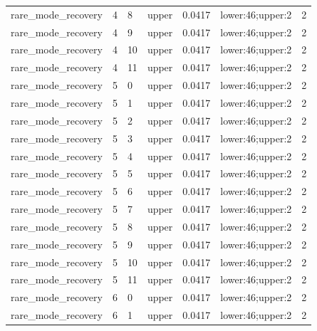 \documentclass{article}
\begin{document}
\begin{table}[tbp]
{\begin{tabular}{lllllll}
rare\_mode\_recovery & 4 & 8 & upper & 0.0417 & lower:46;upper:2 & 2 \\
rare\_mode\_recovery & 4 & 9 & upper & 0.0417 & lower:46;upper:2 & 2 \\
rare\_mode\_recovery & 4 & 10 & upper & 0.0417 & lower:46;upper:2 & 2 \\
rare\_mode\_recovery & 4 & 11 & upper & 0.0417 & lower:46;upper:2 & 2 \\
rare\_mode\_recovery & 5 & 0 & upper & 0.0417 & lower:46;upper:2 & 2 \\
rare\_mode\_recovery & 5 & 1 & upper & 0.0417 & lower:46;upper:2 & 2 \\
rare\_mode\_recovery & 5 & 2 & upper & 0.0417 & lower:46;upper:2 & 2 \\
rare\_mode\_recovery & 5 & 3 & upper & 0.0417 & lower:46;upper:2 & 2 \\
rare\_mode\_recovery & 5 & 4 & upper & 0.0417 & lower:46;upper:2 & 2 \\
rare\_mode\_recovery & 5 & 5 & upper & 0.0417 & lower:46;upper:2 & 2 \\
rare\_mode\_recovery & 5 & 6 & upper & 0.0417 & lower:46;upper:2 & 2 \\
rare\_mode\_recovery & 5 & 7 & upper & 0.0417 & lower:46;upper:2 & 2 \\
rare\_mode\_recovery & 5 & 8 & upper & 0.0417 & lower:46;upper:2 & 2 \\
rare\_mode\_recovery & 5 & 9 & upper & 0.0417 & lower:46;upper:2 & 2 \\
rare\_mode\_recovery & 5 & 10 & upper & 0.0417 & lower:46;upper:2 & 2 \\
rare\_mode\_recovery & 5 & 11 & upper & 0.0417 & lower:46;upper:2 & 2 \\
rare\_mode\_recovery & 6 & 0 & upper & 0.0417 & lower:46;upper:2 & 2 \\
rare\_mode\_recovery & 6 & 1 & upper & 0.0417 & lower:46;upper:2 & 2 \\
\bottomrule
\end{tabular}
}
\end{table}

\clearpage
\end{document}

